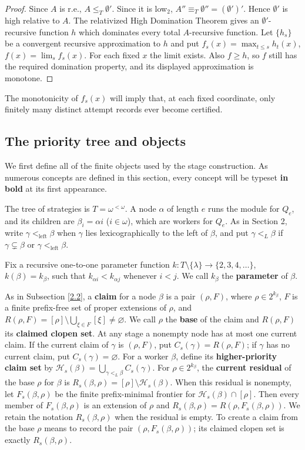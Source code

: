 \documentclass[10pt,a4paper]{amsart}
\begin{document}
\begin{proof}
Since $A$ is r.e., $A\leq_T\emptyset'$. Since it is low$_2$, $A''\equiv_T\emptyset''=(\emptyset')'$.
Hence $\emptyset'$ is high relative to $A$. The relativized High Domination
Theorem gives an $\emptyset'$-recursive function $h$ which dominates every
total $A$-recursive function. Let $\{h_s\}$ be a convergent recursive
approximation to $h$ and put $f_s(x)=\max_{t\leq s}h_t(x)$,
$f(x)=\lim_s f_s(x)$. For each fixed $x$ the limit exists. Also $f\geq h$, so $f$ still has the
required domination property, and its displayed approximation is monotone.
\end{proof}

The monotonicity of $f_s(x)$ will imply that, at each fixed coordinate, only
finitely many distinct attempt records ever become certified.

\subsection{The priority tree and objects}

We first define all of the finite objects used by the stage construction. As numerous concepts are defined in this section, every concept will be typeset \textbf{in bold} at its first appearance.

The tree of strategies is $T=\omega^{<\omega}$. A node $\alpha$ of length
$e$ runs the module for $Q_e$, and its children are
$\beta_i=\alpha i$ ($i\in\omega$), which are workers for $Q_e$. As in Section 2, write
$\gamma<_{\mathrm{left}}\beta$ when $\gamma$ lies lexicographically to the
left of $\beta$, and put $\gamma<_L\beta$ if
$\gamma\subsetneq\beta$ or $\gamma<_{\mathrm{left}}\beta$.

Fix a recursive one-to-one parameter function $k:T\setminus\{\lambda\}\longrightarrow\{2,3,4,\ldots\}$, $k(\beta)=k_\beta$,
such that $k_{\alpha i}<k_{\alpha j}$ whenever $i<j$. We call $k_\beta$
the \textbf{parameter} of $\beta$.

As in Subsection \ref{2.2}, a \textbf{claim} for a node $\beta$ is a pair
$(\rho,F)$, where $\rho\in2^{k_\beta}$, $F$ is a finite prefix-free set of
proper extensions of $\rho$, and
$R(\rho,F)=[\rho]\setminus\bigcup_{\xi\in F}[\xi]\neq\varnothing$.
We call $\rho$ the \textbf{base} of the claim and $R(\rho,F)$ its
\textbf{claimed clopen set}. At any stage a nonempty node has at most one
current claim. If the current claim of $\gamma$ is $(\rho,F)$, put
$C_s(\gamma)=R(\rho,F)$; if $\gamma$ has no current claim, put
$C_s(\gamma)=\varnothing$. For a worker $\beta$, define its
\textbf{higher-priority claim set} by
$\mathcal H_s(\beta)=\bigcup_{\gamma<_L\beta}C_s(\gamma)$.
For $\rho\in2^{k_\beta}$, the \textbf{current residual} of the base $\rho$
for $\beta$ is $R_s(\beta,\rho)=[\rho]\setminus\mathcal H_s(\beta)$.
When this residual is nonempty, let $F_s(\beta,\rho)$ be the finite
prefix-minimal frontier for $\mathcal H_s(\beta)\cap[\rho]$. Then every member
of $F_s(\beta,\rho)$ is an extension of $\rho$ and $R_s(\beta,\rho)=R(\rho,F_s(\beta,\rho))$.
We retain the notation $R_s(\beta,\rho)$ when the residual is empty. To create
a claim from the base $\rho$ means to record the pair
$(\rho,F_s(\beta,\rho))$; its claimed clopen set is exactly
$R_s(\beta,\rho)$.
\end{document}
